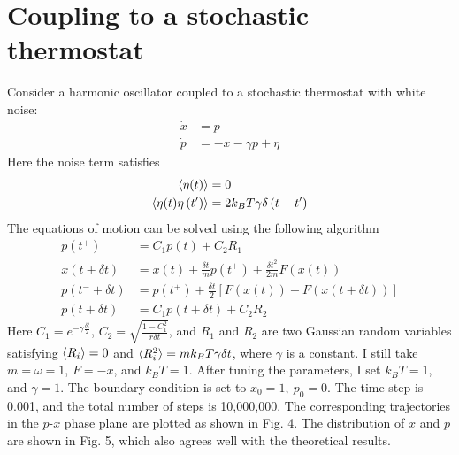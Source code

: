 \documentclass{article}
\begin{document}
\section{Coupling to a stochastic thermostat}
Consider a harmonic oscillator coupled to a stochastic thermostat with white noise:
\begin{equation}
    \begin{aligned}
        \dot{x} &= p \\
        \dot{p} &= -x-\gamma p+\eta
    \end{aligned}
\end{equation}
Here the noise term satisfies
\begin{equation}
    \begin{aligned}
        \braket{\eta(t)} &= 0 \\
        \braket{\eta(t) \eta\left(t^{\prime}\right)} &= 2 k_B T \gamma \delta\left(t-t^{\prime}\right)
    \end{aligned}
\end{equation}
The equations of motion can be solved using the following algorithm
\begin{equation}
    \begin{aligned}
        p(t^+) &= C_1 p(t) + C_2 R_1 \\
        x(t + \delta t) &= x(t) + \frac{\delta t}{m} p(t^+) + \frac{\delta t^2}{2m} F(x(t)) \\
        p(t^- + \delta t) &= p(t^+) + \frac{\delta t}{2} [F(x(t)) + F(x(t + \delta t))] \\
        p(t + \delta t) &= C_1 p(t + \delta t) + C_2 R_2
    \end{aligned}
\end{equation}
Here $C_1 = e^{-\gamma \frac{\delta t}{2}}$, $C_2 = \sqrt{\frac{1 - C_1^2}{r \delta t}}$, and $R_1$ and $R_2$ are two Gaussian random variables satisfying $\braket{R_i} = 0$ and $\braket{R_i^2} = mk_BT \gamma \delta t$, where $\gamma$ is a constant. I still take $m = \omega = 1$, $F = -x$, and $k_B T =1$. After tuning the parameters, I set $k_B T = 1$, and $\gamma = 1$. The boundary condition is set to $x_0 = 1,\ p_0 = 0$. The time step is 0.001, and the total number of steps is 10,000,000. The corresponding trajectories in the $p$-$x$ phase plane are plotted as shown in Fig. 4. The distribution of $x$ and $p$ are shown in Fig. 5, which also agrees well with the theoretical results. 
\end{document}
